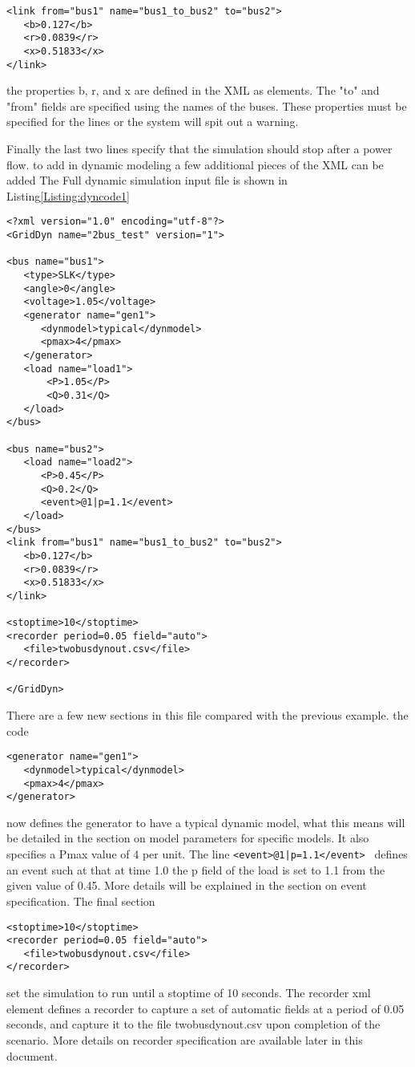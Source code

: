 \documentclass[12pt]{article} %
\begin{document}
\begin{lstlisting}
<link from="bus1" name="bus1_to_bus2" to="bus2">
   <b>0.127</b>
   <r>0.0839</r>
   <x>0.51833</x>
</link>
\end{lstlisting}
the properties b, r, and x are defined in the XML as elements.  The "to" and "from" fields are specified using the names of the buses.  These properties must be specified for the lines or the system will spit out a warning.

Finally the last two lines specify that the simulation should stop after a power flow.
to add in dynamic modeling a few additional pieces of the XML can be added The Full dynamic simulation input file is shown in Listing\ref{Listing:dyncode1}

\begin{lstlisting}[label={Listing:dyncode1}]
<?xml version="1.0" encoding="utf-8"?>
<GridDyn name="2bus_test" version="1">

<bus name="bus1">
   <type>SLK</type>
   <angle>0</angle>
   <voltage>1.05</voltage>
   <generator name="gen1">
      <dynmodel>typical</dynmodel>
      <pmax>4</pmax>
   </generator>
   <load name="load1">
       <P>1.05</P>
       <Q>0.31</Q>
   </load>
</bus>

<bus name="bus2">
   <load name="load2">
      <P>0.45</P>
      <Q>0.2</Q>
      <event>@1|p=1.1</event>
   </load>
</bus>
<link from="bus1" name="bus1_to_bus2" to="bus2">
   <b>0.127</b>
   <r>0.0839</r>
   <x>0.51833</x>
</link>

<stoptime>10</stoptime>
<recorder period=0.05 field="auto">
   <file>twobusdynout.csv</file>
</recorder>

</GridDyn>
\end{lstlisting}

There are a few new sections in this file compared with the previous example.
the code
\begin{lstlisting}
<generator name="gen1">
   <dynmodel>typical</dynmodel>
   <pmax>4</pmax>
</generator>
\end{lstlisting}
now defines the generator to have a typical dynamic model, what this means will be detailed in the section on model parameters for specific models. It also specifies a Pmax value of 4 per unit.
The line {\tt <event>@1|p=1.1</event> } defines an event such at that at time 1.0 the p field of the load is set to 1.1 from the given value of 0.45.  More details will be explained in the section on event specification.
The final section
\begin{lstlisting}[label={lst:recorder}]
<stoptime>10</stoptime>
<recorder period=0.05 field="auto">
   <file>twobusdynout.csv</file>
</recorder>
\end{lstlisting}
set the simulation to run until a stoptime of 10 seconds.    The recorder xml element defines a recorder to capture a set of automatic fields at a period of 0.05 seconds, and capture it to the file twobusdynout.csv upon completion of the scenario.  More details  on recorder specification are available later in this document.
\end{document}
